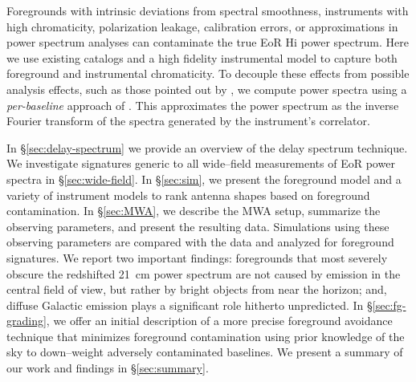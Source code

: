 \documentclass[preprint2,iop,numberedappendix,twocolappendix,appendixfloats]{emulateapj}
\begin{document}
Foregrounds with intrinsic deviations from spectral smoothness, instruments with high chromaticity, polarization leakage, calibration errors, or approximations in power spectrum analyses can contaminate the true EoR H{\sc i} power spectrum. Here we use existing catalogs and a high fidelity instrumental model to capture both foreground and instrumental chromaticity. To decouple these effects from possible analysis effects, such as those pointed out by \citet{haz13}, we compute power spectra using a {\it per-baseline} approach of \citet{par12b}. This approximates the power spectrum as the inverse Fourier transform of the spectra generated by the instrument's correlator. 


In \S\ref{sec:delay-spectrum} we provide an overview of the delay spectrum technique. We investigate signatures generic to all wide--field measurements of EoR power spectra in \S\ref{sec:wide-field}. In \S\ref{sec:sim}, we present the foreground model and a variety of instrument models to rank antenna shapes based on foreground contamination. In \S\ref{sec:MWA}, we describe the MWA setup, summarize the observing parameters, and present the resulting data. Simulations using these observing parameters are compared with the data and analyzed for foreground signatures. We report two important findings: foregrounds that most severely obscure the redshifted 21~cm power spectrum are not caused by emission in the central field of view, but rather by bright objects from near the horizon; and, diffuse Galactic emission plays a significant role hitherto unpredicted. In \S\ref{sec:fg-grading}, we offer an initial description of a more precise foreground avoidance technique that minimizes foreground contamination using prior knowledge of the sky to down--weight adversely contaminated baselines. We present a summary of our work and findings in \S\ref{sec:summary}.
\end{document}
